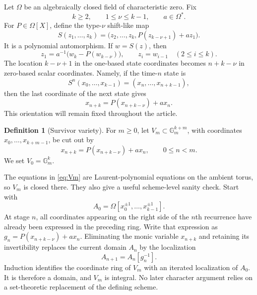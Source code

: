 \documentclass[11pt]{article}
\theoremstyle{definition}
\newtheorem{definition}[theorem]{Definition}
\theoremstyle{remark}
\newcommand{\Gm}{\mathbb{G}_{m}}
\newcommand{\Om}{\Omega}
\begin{document}
Let $\Om$ be an algebraically closed field of characteristic zero.  Fix
\[
k\geq2,\qquad 1\leq\nu\leq k-1,\qquad a\in\Om^*.
\]
For $P\in\Om[X]$, define the type-$\nu$ shift-like map
\begin{equation}
S(z_1,\ldots,z_k)
 =\bigl(z_2,\ldots,z_k,P(z_{k-\nu+1})+az_1\bigr).
\label{eq:map}
\end{equation}
It is a polynomial automorphism.  If $w=S(z)$, then
\[
z_1=a^{-1}\bigl(w_k-P(w_{k-\nu})\bigr),
\qquad z_i=w_{i-1}\quad(2\leq i\leq k).
\]
The location $k-\nu+1$ in the one-based state coordinates becomes $n+k-\nu$ in zero-based scalar coordinates.  Namely, if the time-$n$ state is
\[
S^n(x_0,\ldots,x_{k-1})=(x_n,\ldots,x_{n+k-1}),
\]
then the last coordinate of the next state gives
\begin{equation}
x_{n+k}=P(x_{n+k-\nu})+a x_n.
\label{eq:recurrence}
\end{equation}
This orientation will remain fixed throughout the article.

\begin{definition}[Survivor variety]
For $m\geq0$, let $V_m\subset\Gm^{k+m}$, with coordinates
$x_0,\ldots,x_{k+m-1}$, be cut out by
\begin{equation}
x_{n+k}=P(x_{n+k-\nu})+a x_n,
\qquad 0\leq n<m.
\label{eq:Vm}
\end{equation}
We set $V_0=\Gm^k$.
\end{definition}

The equations in \eqref{eq:Vm} are Laurent-polynomial equations on the ambient torus, so $V_m$ is closed there.  They also give a useful scheme-level sanity check.  Start with
\[
A_0=\Om[x_0^{\pm1},\ldots,x_{k-1}^{\pm1}].
\]
At stage $n$, all coordinates appearing on the right side of the $n$th recurrence have already been expressed in the preceding ring.  Write that expression as $g_n=P(x_{n+k-\nu})+ax_n$.  Eliminating the monic variable $x_{n+k}$ and retaining its invertibility replaces the current domain $A_n$ by the localization
\[
A_{n+1}=A_n[g_n^{-1}].
\]
Induction identifies the coordinate ring of $V_m$ with an iterated localization of $A_0$.  It is therefore a domain, and $V_m$ is integral.  No later character argument relies on a set-theoretic replacement of the defining scheme.
\end{document}
